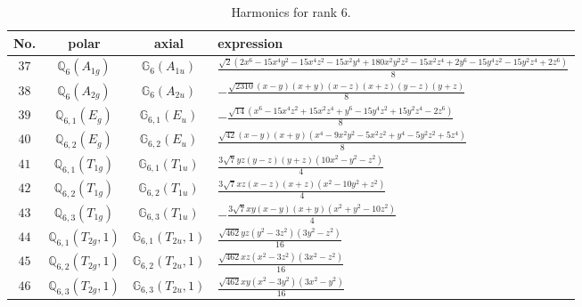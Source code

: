 \documentclass[fleqn,8pt,landscape]{jsarticle}
\begin{document}
\begin{table}[ht!]
\begin{center}
\caption{Harmonics for rank 6.}
\renewcommand{\arraystretch}{1.3}
\begin{tabular}{cccl} \hline \hline
No. & polar & axial & expression \\ \hline
$ 37 $ & $ \mathbb{Q}_{6}(A_{1g}) $ & $ \mathbb{G}_{6}(A_{1u}) $ & $ \frac{\sqrt{2} \left(2 x^{6} - 15 x^{4} y^{2} - 15 x^{4} z^{2} - 15 x^{2} y^{4} + 180 x^{2} y^{2} z^{2} - 15 x^{2} z^{4} + 2 y^{6} - 15 y^{4} z^{2} - 15 y^{2} z^{4} + 2 z^{6}\right)}{8} $ \\
$ 38 $ & $ \mathbb{Q}_{6}(A_{2g}) $ & $ \mathbb{G}_{6}(A_{2u}) $ & $ - \frac{\sqrt{2310} \left(x - y\right) \left(x + y\right) \left(x - z\right) \left(x + z\right) \left(y - z\right) \left(y + z\right)}{8} $ \\
$ 39 $ & $ \mathbb{Q}_{6,1}(E_{g}) $ & $ \mathbb{G}_{6,1}(E_{u}) $ & $ - \frac{\sqrt{14} \left(x^{6} - 15 x^{4} z^{2} + 15 x^{2} z^{4} + y^{6} - 15 y^{4} z^{2} + 15 y^{2} z^{4} - 2 z^{6}\right)}{8} $ \\
$ 40 $ & $ \mathbb{Q}_{6,2}(E_{g}) $ & $ \mathbb{G}_{6,2}(E_{u}) $ & $ \frac{\sqrt{42} \left(x - y\right) \left(x + y\right) \left(x^{4} - 9 x^{2} y^{2} - 5 x^{2} z^{2} + y^{4} - 5 y^{2} z^{2} + 5 z^{4}\right)}{8} $ \\
$ 41 $ & $ \mathbb{Q}_{6,1}(T_{1g}) $ & $ \mathbb{G}_{6,1}(T_{1u}) $ & $ \frac{3 \sqrt{7} y z \left(y - z\right) \left(y + z\right) \left(10 x^{2} - y^{2} - z^{2}\right)}{4} $ \\
$ 42 $ & $ \mathbb{Q}_{6,2}(T_{1g}) $ & $ \mathbb{G}_{6,2}(T_{1u}) $ & $ \frac{3 \sqrt{7} x z \left(x - z\right) \left(x + z\right) \left(x^{2} - 10 y^{2} + z^{2}\right)}{4} $ \\
$ 43 $ & $ \mathbb{Q}_{6,3}(T_{1g}) $ & $ \mathbb{G}_{6,3}(T_{1u}) $ & $ - \frac{3 \sqrt{7} x y \left(x - y\right) \left(x + y\right) \left(x^{2} + y^{2} - 10 z^{2}\right)}{4} $ \\
$ 44 $ & $ \mathbb{Q}_{6,1}(T_{2g},1) $ & $ \mathbb{G}_{6,1}(T_{2u},1) $ & $ \frac{\sqrt{462} y z \left(y^{2} - 3 z^{2}\right) \left(3 y^{2} - z^{2}\right)}{16} $ \\
$ 45 $ & $ \mathbb{Q}_{6,2}(T_{2g},1) $ & $ \mathbb{G}_{6,2}(T_{2u},1) $ & $ \frac{\sqrt{462} x z \left(x^{2} - 3 z^{2}\right) \left(3 x^{2} - z^{2}\right)}{16} $ \\
$ 46 $ & $ \mathbb{Q}_{6,3}(T_{2g},1) $ & $ \mathbb{G}_{6,3}(T_{2u},1) $ & $ \frac{\sqrt{462} x y \left(x^{2} - 3 y^{2}\right) \left(3 x^{2} - y^{2}\right)}{16} $ \\

\end{tabular}
\end{center}
\end{table}
\end{document}
